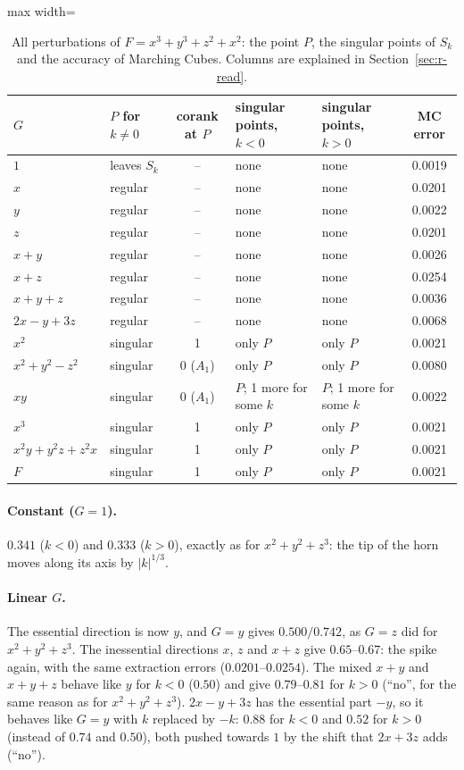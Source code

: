 \documentclass[12pt, a4paper]{article}
\theoremstyle{plain}
\theoremstyle{definition}
\theoremstyle{remark}
\theoremstyle{definition}
\begin{document}
\begin{table}[!h]
\centering
\footnotesize
\begin{adjustbox}{max width=\textwidth}
\begin{tabular}{l l c l l c}
\toprule
$G$ & $P$ for $k\neq0$ & corank at $P$ & singular points, $k<0$ & singular points, $k>0$ & MC error \\
\midrule
$1$ & leaves $S_k$ & -- & none & none & 0.0019 \\
$x$ & regular & -- & none & none & 0.0201 \\
$y$ & regular & -- & none & none & 0.0022 \\
$z$ & regular & -- & none & none & 0.0201 \\
$x+y$ & regular & -- & none & none & 0.0026 \\
$x+z$ & regular & -- & none & none & 0.0254 \\
$x+y+z$ & regular & -- & none & none & 0.0036 \\
$2x-y+3z$ & regular & -- & none & none & 0.0068 \\
$x^2$ & singular & 1 & only $P$ & only $P$ & 0.0021 \\
$x^2+y^2-z^2$ & singular & 0 ($A_1$) & only $P$ & only $P$ & 0.0080 \\
$xy$ & singular & 0 ($A_1$) & $P$; 1 more for some $k$ & $P$; 1 more for some $k$ & 0.0022 \\
$x^3$ & singular & 1 & only $P$ & only $P$ & 0.0021 \\
$x^2y+y^2z+z^2x$ & singular & 1 & only $P$ & only $P$ & 0.0021 \\
$F$ & singular & 1 & only $P$ & only $P$ & 0.0021 \\
\bottomrule
\end{tabular}
\end{adjustbox}
\caption[Singular points for $x^3+y^3+z^2+x^2$]{All perturbations of $F=x^3+y^3+z^2+x^2$: the point $P$, the singular points of $S_k$ and the accuracy of Marching Cubes. Columns are explained in Section~\ref{sec:r-read}.}
\label{tab:r-A2c-points}
\end{table}
\paragraph{Constant ($G=1$).} $0.341$ ($k<0$) and $0.333$ ($k>0$), exactly as for
$x^2+y^2+z^3$: the tip of the horn moves along its axis by $|k|^{1/3}$.

\paragraph{Linear $G$.} The essential direction is now $y$, and $G=y$ gives
$0.500/0.742$, as $G=z$ did for $x^2+y^2+z^3$. The inessential directions $x$, $z$
and $x+z$ give $0.65$--$0.67$: the spike again, with the same extraction errors
($0.0201$--$0.0254$). The mixed $x+y$ and $x+y+z$ behave like $y$ for $k<0$ ($0.50$)
and give $0.79$--$0.81$ for $k>0$ (``no'', for the same reason as for
$x^2+y^2+z^3$). $2x-y+3z$ has the essential part $-y$, so it behaves like $G=y$ with
$k$ replaced by $-k$: $0.88$ for $k<0$ and $0.52$ for $k>0$ (instead of $0.74$ and
$0.50$), both pushed towards $1$ by the shift that $2x+3z$ adds (``no'').
\end{document}
